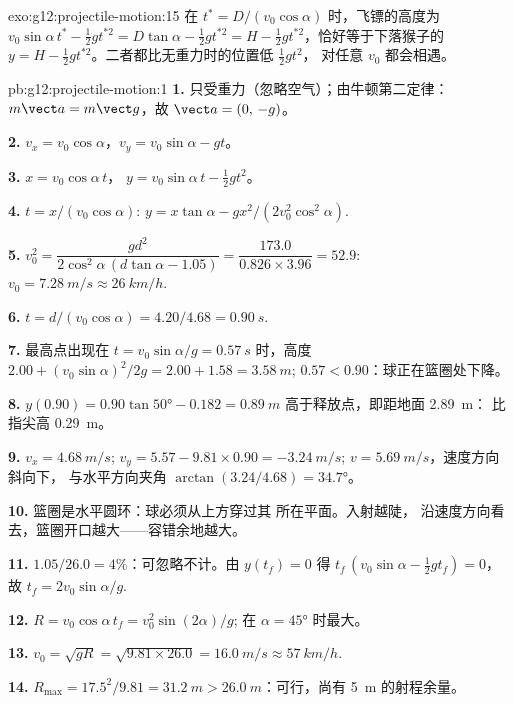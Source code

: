\begin{solution}{exo:g12:projectile-motion:15}
在 $t^* = D/(v_0\cos\alpha)$ 时，飞镖的高度为
$v_0\sin\alpha\, t^* - \tfrac12 g t^{*2} = D\tan\alpha - \tfrac12 g
t^{*2} = H - \tfrac12 g t^{*2}$，恰好等于下落猴子的
$y = H - \tfrac12 g t^{*2}$。二者都比无重力时的位置低 $\tfrac12 gt^2$，
对任意 $v_0$ 都会相遇。
\end{solution}

\begin{solution}{pb:g12:projectile-motion:1}
\textbf{1.} 只受重力（忽略空气）；由牛顿第二定律：
$m\vect a = m\vect g$，故 $\vect a = (0,\,-g)$。

\textbf{2.} $v_x = v_0\cos\alpha$，$v_y = v_0\sin\alpha - gt$。

\textbf{3.} $x = v_0\cos\alpha\, t$，
$y = v_0\sin\alpha\, t - \tfrac12 gt^2$。

\textbf{4.} $t = x/(v_0\cos\alpha)$:
$y = x\tan\alpha - g x^2/(2v_0^2\cos^2\alpha)$.

\textbf{5.} $v_0^2 = \dfrac{g d^2}{2\cos^2\alpha\,(d\tan\alpha -
1.05)} = \dfrac{173.0}{0.826 \times 3.96} = 52.9$:
$v_0 = \qty{7.28}{m/s} \approx \qty{26}{km/h}$.

\textbf{6.} $t = d/(v_0\cos\alpha) = 4.20/4.68 = \qty{0.90}{s}$.

\textbf{7.} 最高点出现在 $t = v_0\sin\alpha/g = \qty{0.57}{s}$ 时，高度
$2.00 + (v_0\sin\alpha)^2/2g = 2.00 + 1.58 = \qty{3.58}{m}$;
$0.57 < 0.90$：球正在篮圈处下降。

\textbf{8.} $y(0.90) = 0.90\tan\ang{50} - 0.182 = \qty{0.89}{m}$
高于释放点，即距地面 \qty{2.89}{m}：
比指尖高 \qty{0.29}{m}。

\textbf{9.} $v_x = \qty{4.68}{m/s}$;
$v_y = 5.57 - 9.81 \times 0.90 = \qty{-3.24}{m/s}$;
$v = \qty{5.69}{m/s}$，速度方向斜向下，
与水平方向夹角 $\arctan(3.24/4.68) = \ang{34.7}$。

\textbf{10.} 篮圈是水平圆环：球必须从上方穿过其
所在平面。入射越陡，
沿速度方向看去，篮圈开口越大——容错余地越大。

\textbf{11.} $1.05/26.0 = 4\%$：可忽略不计。由 $y(t_f) = 0$ 得
$t_f\,(v_0\sin\alpha - \tfrac12 g t_f) = 0$，故
$t_f = 2v_0\sin\alpha/g$.

\textbf{12.} $R = v_0\cos\alpha\, t_f = v_0^2\sin(2\alpha)/g$;
在 $\alpha = \ang{45}$ 时最大。

\textbf{13.} $v_0 = \sqrt{gR} = \sqrt{9.81 \times 26.0} =
\qty{16.0}{m/s} \approx \qty{57}{km/h}$.

\textbf{14.} $R_{\max} = 17.5^2/9.81 = \qty{31.2}{m} >
\qty{26.0}{m}$：可行，尚有 \qty{5}{m} 的射程余量。


\end{solution}

